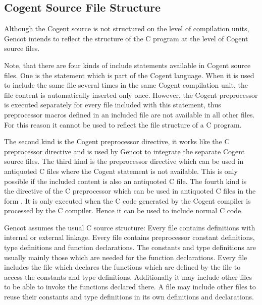 \subsection{Cogent Source File Structure}
\label{design-files}

Although the Cogent source is not structured on the level of compilation units, Gencot intends to reflect the structure of 
the C program at the level of Cogent source files. 

Note, that there are four kinds of include statements available in Cogent source files. One is the  statement which
is part of the Cogent language. When it is used to include the same file several times in the same Cogent compilation unit,
the file content is automatically inserted only once. However, the Cogent preprocessor is executed separately for every file included 
with this  statement, thus preprocessor macros defined in an included file are not available in all other files. For 
this reason it cannot be used to reflect the file structure of a C program.

The second kind is the Cogent preprocessor  directive, it works like the C preprocessor  directive
and is used by Gencot to integrate the separate Cogent source files. 
The third kind is the preprocessor  directive 
which can be used in antiquoted C files where the Cogent  statement is not available. This is only possible 
if the included content is also an antiquoted C file. The fourth kind
is the  directive of the C preprocessor which can be used in antiquoted C files in the form 
. It is only executed when the C code generated by the Cogent compiler is processed by the C compiler.
Hence it can be used to include normal C code.

Gencot assumes the usual C source structure: Every  file contains definitions with internal or external linkage.
Every 
file contains preprocessor constant definitions, type definitions and function declarations. The constants and type definitions 
are usually mainly those which are needed for the function declarations. Every  file includes the  file which
declares the functions which are defined by the  file to access the constants and type definitions. Additionally it may
include other  files to be able to invoke the functions declared there. A  file may include other  files
to reuse their constants and type definitions in its own definitions and declarations.

